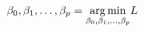 \documentclass[preview]{standalone}
\begin{document}
\begin{align*}
\special{dvisvgm:raw <g id='unique000'>}\beta_0, \beta_1, \dots, \beta_p=\underset{\beta_0, \beta_1, \dots, \beta_p}{\arg\min}L\special{dvisvgm:raw </g>}
\end{align*}
\end{document}
